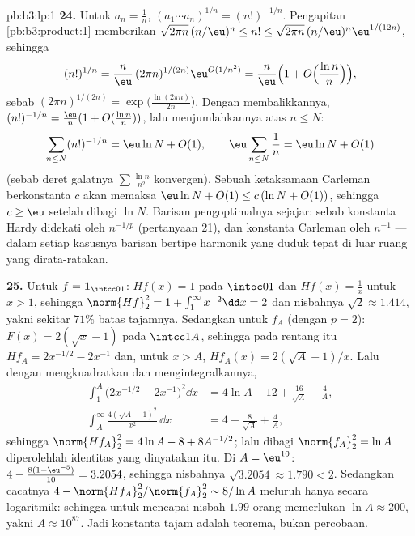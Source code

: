 \begin{solution}{pb:b3:lp:1}
\textbf{24.} Untuk $a_n = \frac1n$, $(a_1\cdots a_n)^{1/n} =
(n!)^{-1/n}$. Pengapitan \cref{pb:b3:product:1} memberikan
$\sqrt{2\pi n}\,(n/\eu)^n \leq n! \leq \sqrt{2\pi
n}\,(n/\eu)^n\eu^{1/(12n)}$, sehingga
\[
(n!)^{1/n} = \frac n\eu\,(2\pi n)^{1/(2n)}
\eu^{O(1/n^2)}
= \frac n\eu\Bigl(1 +
O\Bigl(\frac{\ln n}{n}\Bigr)\Bigr),
\]
sebab $(2\pi n)^{1/(2n)} = \exp\bigl(\frac{\ln(2\pi
n)}{2n}\bigr)$. Dengan membalikkannya, $(n!)^{-1/n} = \frac\eu n(1 +
O(\frac{\ln n}n))$, lalu menjumlahkannya atas $n \leq N$:
\[
\sum_{n\leq N}(n!)^{-1/n}
= \eu\ln N + O(1),
\qquad
\eu\sum_{n\leq N}\frac1n = \eu\ln N + O(1)
\]
(sebab deret galatnya $\sum\frac{\ln n}{n^2}$ konvergen). Sebuah
ketaksamaan Carleman berkonstanta $c$ akan memaksa $\eu\ln N
+ O(1) \leq c\,(\ln N + O(1))$, sehingga $c \geq \eu$ setelah
dibagi $\ln N$. Barisan pengoptimalnya sejajar:
sebab konstanta Hardy didekati oleh $n^{-1/p}$ (pertanyaan 21),
dan konstanta Carleman oleh $n^{-1}$ --- dalam setiap kasusnya barisan bertipe
harmonik yang duduk tepat di luar ruang yang dirata-ratakan.

\textbf{25.} Untuk $f = \mathbf 1_{\intcc01}$: $Hf(x) = 1$ pada
$\intoc01$ dan $Hf(x) = \frac1x$ untuk $x > 1$, sehingga
$\norm{Hf}_2^2 = 1 + \int_1^\infty x^{-2}\dd x = 2$ dan
nisbahnya $\sqrt2 \approx 1.414$, yakni sekitar $71\%$ batas
tajamnya. Sedangkan untuk $f_A$ (dengan $p = 2$): $F(x) = 2(\sqrt x - 1)$ pada
$\intcc1A$, sehingga pada rentang itu $Hf_A = 2x^{-1/2} - 2x^{-1}$
dan, untuk $x > A$, $Hf_A(x) = 2(\sqrt A - 1)/x$. Lalu dengan mengkuadratkan
dan mengintegralkannya,
\begin{align*}
\int_1^A\bigl(2x^{-1/2} - 2x^{-1}\bigr)^2\dd x
&= 4\ln A - 12 + \frac{16}{\sqrt A} - \frac4A,\\
\int_A^{\infty}\frac{4(\sqrt A - 1)^2}{x^2}\,\dd x
&= 4 - \frac{8}{\sqrt A} + \frac4A,
\end{align*}
sehingga $\norm{Hf_A}_2^2 = 4\ln A - 8 + 8A^{-1/2}$; lalu dibagi
$\norm{f_A}_2^2 = \ln A$ diperolehlah identitas yang dinyatakan itu. Di $A
= \eu^{10}$: $4 - \frac{8(1 - \eu^{-5})}{10} = 3.2054$, sehingga
nisbahnya $\sqrt{3.2054} \approx 1.790 < 2$. Sedangkan cacatnya
$4 - \norm{Hf_A}_2^2/\norm{f_A}_2^2 \sim 8/\ln A$ meluruh
hanya secara logaritmik: sehingga untuk mencapai nisbah $1.99$ orang memerlukan
$\ln A \approx 200$, yakni $A \approx 10^{87}$. Jadi konstanta
tajam adalah teorema, bukan percobaan.

\end{solution}
